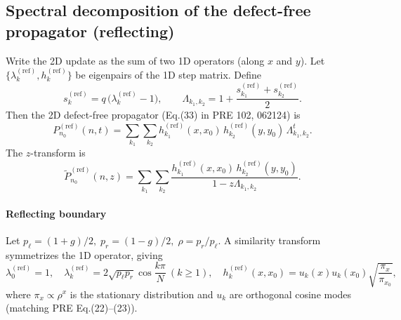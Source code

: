 \documentclass[11pt]{article}
\begin{document}
\subsection{Spectral decomposition of the defect-free propagator (reflecting)}
Write the 2D update as the sum of two 1D operators (along $x$ and $y$). Let $\{\lambda_k^{(\text{ref})},h_k^{(\text{ref})}\}$ be eigenpairs of the 1D step matrix. Define
\begin{equation}
  s_k^{(\text{ref})} = q\,\bigl(\lambda_k^{(\text{ref})}-1\bigr),\qquad
  \Lambda_{k_1,k_2}=1+\frac{s_{k_1}^{(\text{ref})}+s_{k_2}^{(\text{ref})}}{2}.
\end{equation}
Then the 2D defect-free propagator (Eq.(33) in PRE 102, 062124) is
\begin{equation}
  P^{(\text{ref})}_{n_0}(n,t)=\sum_{k_1}\sum_{k_2} h_{k_1}^{(\text{ref})}(x,x_0)\,h_{k_2}^{(\text{ref})}(y,y_0)\,\Lambda_{k_1,k_2}^t.
  \label{eq:P_time}
\end{equation}
The $z$-transform is
\begin{equation}
  \tilde P^{(\text{ref})}_{n_0}(n,z)=\sum_{k_1}\sum_{k_2}
  \frac{h_{k_1}^{(\text{ref})}(x,x_0)\,h_{k_2}^{(\text{ref})}(y,y_0)}{1-z\Lambda_{k_1,k_2}}.
  \label{eq:P_z}
\end{equation}

\paragraph{Reflecting boundary} \;\;
Let $p_\ell=(1+g)/2,\;p_r=(1-g)/2,\;\rho=p_r/p_\ell$. A similarity transform symmetrizes the 1D operator, giving
\begin{equation}
  \lambda_0^{(\text{ref})}=1,\quad
  \lambda_k^{(\text{ref})}=2\sqrt{p_\ell p_r}\cos\frac{k\pi}{N}\ (k\ge 1),\quad
  h_k^{(\text{ref})}(x,x_0)=u_k(x)u_k(x_0)\sqrt{\frac{\pi_x}{\pi_{x_0}}},
\end{equation}
where $\pi_x\propto \rho^x$ is the stationary distribution and $u_k$ are orthogonal cosine modes (matching PRE Eq.(22)--(23)).
\end{document}
